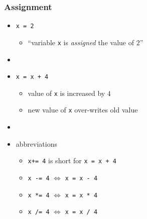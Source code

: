 \documentclass[english,14pt]{beamer}
\newcommand\red[1]{{\color{red} #1}}
\begin{document}
\begin{frame}[fragile]

\frametitle{Assignment}

\begin{itemize}
	\item \texttt{x = 2}
	\begin{itemize}
		\item ``variable \texttt{x} is \red{\emph{assigned}} the value of $2$''
	\end{itemize}
	\item[]
	\item \texttt{x = x + 4}
	\begin{itemize}
		\item value of \texttt{x} is increased by $4$
		\item new value of \texttt{x} over-writes old value
	\end{itemize}
	\item[]
	\item abbreviations
		\begin{itemize}
		\item \texttt{x+= 4} is short for \texttt{x = x + 4}
		\item \texttt{x -= 4} $\Longleftrightarrow$  \texttt{x = x - 4}
		\item \texttt{x *= 4} $\Longleftrightarrow$ \texttt{x = x * 4}
		\item \texttt{x /= 4} $\Longleftrightarrow$ \texttt{x = x / 4}
	\end{itemize}

\end{itemize}

\end{frame}

\end{document}
